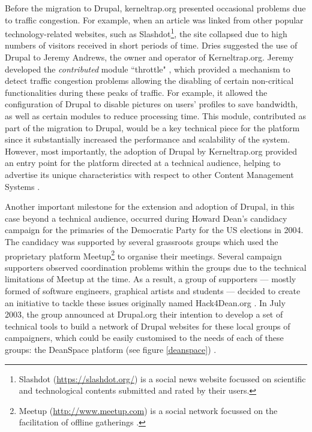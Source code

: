 Before the migration to Drupal, kerneltrap.org presented occasional problems due to traffic congestion. For example, when an article was linked from other popular technology-related websites, such as Slashdot\footnote{Slashdot (\url{https://slashdot.org/}) is a social news website focussed on scientific and technological contents submitted and rated by their users.}, the site collapsed due to high numbers of visitors received in short periods of time. Dries suggested the use of Drupal to Jeremy Andrews, the owner and operator of Kerneltrap.org. Jeremy developed the \textit{contributed} module ``throttle" \parencite{drupal-throttle:2013:Online}, which provided a mechanism to detect traffic congestion problems allowing the disabling of certain non-critical functionalities during these peaks of traffic. For example, it allowed the configuration of Drupal to disable pictures on users' profiles to save bandwidth, as well as certain modules to reduce processing time. This module, contributed as part of the migration to Drupal, would be a key technical piece for the platform since it substantially increased the performance and scalability of the system. However, most importantly, the adoption of Drupal by Kerneltrap.org provided an entry point for the platform directed at a technical audience, helping to advertise its unique characteristics with respect to other Content Management Systems \parencite{benjamin2011definitive}.

Another important milestone for the extension and adoption of Drupal, in this case beyond a technical audience, occurred during Howard Dean's candidacy campaign for the primaries of the Democratic Party for the US elections in 2004. The candidacy was supported by several grassroots groups which used the proprietary platform Meetup\footnote{Meetup (\url{http://www.meetup.com}) is a social network focussed on the facilitation of offline gatherings \parencite{meetup:2017:Online}.} to organise their meetings. Several campaign supporters observed coordination problems within the groups due to the technical limitations of Meetup at the time. As a result,  a group of supporters --- mostly formed of software engineers, graphical artists and students --- decided to create an initiative to tackle these issues originally named Hack4Dean.org \parencite{kreiss2010open, drupal-dean-campaign:2013:Online}. In July 2003, the group announced at Drupal.org \parencite{drupal-dean-announcement:2013:Online} their intention to develop a set of technical tools to build a network of Drupal websites for these local groups of campaigners, which could be easily customised to the needs of each of these groups: the DeanSpace platform (see figure \ref{deanspace}) \parencite{chadwick2005internet, lebkowsky2005deanspace}. %

